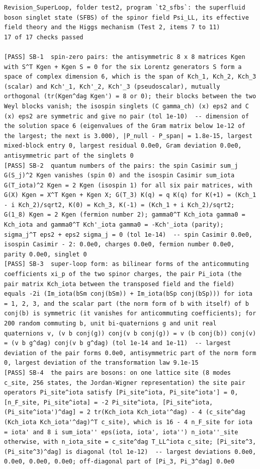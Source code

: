 \documentclass[
  10pt,
]{article}
\begin{document}
\begin{verbatim}
Revision_SuperLoop, folder test2, program `t2_sfbs`: the superfluid boson singlet state (SFBS) of the spinor field Psi_LL, its effective field theory and the Higgs mechanism (Test 2, items 7 to 11)
17 of 17 checks passed

[PASS] SB-1  spin-zero pairs: the antisymmetric 8 x 8 matrices Kgen with S^T Kgen + Kgen S = 0 for the six Lorentz generators S form a space of complex dimension 6, which is the span of Kch_1, Kch_2, Kch_3 (scalar) and Kch'_1, Kch'_2, Kch'_3 (pseudoscalar), mutually orthogonal (tr(Kgen^dag Kgen') = 8 or 0); their blocks between the two Weyl blocks vanish; the isospin singlets (C gamma_ch) (x) eps2 and C (x) eps2 are symmetric and give no pair (tol 1e-10)  -- dimension of the solution space 6 (eigenvalues of the Gram matrix below 1e-12 of the largest; the next is 3.000), |P_null - P_span| = 1.8e-15, largest mixed-block entry 0, largest residual 0.0e0, Gram deviation 0.0e0, antisymmetric part of the singlets 0
[PASS] SB-2  quantum numbers of the pairs: the spin Casimir sum_j G(S_j)^2 Kgen vanishes (spin 0) and the isospin Casimir sum_iota G(T_iota)^2 Kgen = 2 Kgen (isospin 1) for all six pair matrices, with G(X) Kgen = X^T Kgen + Kgen X; G(T_3) K(q) = q K(q) for K(+1) = (Kch_1 - i Kch_2)/sqrt2, K(0) = Kch_3, K(-1) = (Kch_1 + i Kch_2)/sqrt2; G(1_8) Kgen = 2 Kgen (fermion number 2); gamma0^T Kch_iota gamma0 = Kch_iota and gamma0^T Kch'_iota gamma0 = -Kch'_iota (parity); sigma_j^T eps2 + eps2 sigma_j = 0 (tol 1e-14)  -- spin Casimir 0.0e0, isospin Casimir - 2: 0.0e0, charges 0.0e0, fermion number 0.0e0, parity 0.0e0, singlet 0
[PASS] SB-3  super-loop form: as bilinear forms of the anticommuting coefficients xi_p of the two spinor charges, the pair Pi_iota (the pair matrix Kch_iota between the transposed field and the field) equals -2i (Im_iota(bSm conj(bSm)) + Im_iota(bSp conj(bSp))) for iota = 1, 2, 3, and the scalar part (the norm form of b with itself) of b conj(b) is symmetric (it vanishes for anticommuting coefficients); for 200 random commuting b, unit bi-quaternions g and unit real quaternions v, (v b conj(g)) conj(v b conj(g)) = v (b conj(b)) conj(v) = (v b g^dag) conj(v b g^dag) (tol 1e-14 and 1e-11)  -- largest deviation of the pair forms 0.0e0, antisymmetric part of the norm form 0, largest deviation of the transformation law 9.1e-15
[PASS] SB-4  the pairs are bosons: on one lattice site (8 modes c_site, 256 states, the Jordan-Wigner representation) the site pair operators Pi_site^iota satisfy [Pi_site^iota, Pi_site^iota'] = 0, [n_F_site, Pi_site^iota] = -2 Pi_site^iota, [Pi_site^iota, (Pi_site^iota')^dag] = 2 tr(Kch_iota Kch_iota'^dag) - 4 (c_site^dag (Kch_iota Kch_iota'^dag)^T c_site), which is 16 - 4 n_F_site for iota = iota' and 8 i sum_iota'' eps(iota, iota', iota'') n_iota''_site otherwise, with n_iota_site = c_site^dag T_LL^iota c_site; [Pi_site^3, (Pi_site^3)^dag] is diagonal (tol 1e-12)  -- largest deviations 0.0e0, 0.0e0, 0.0e0, 0.0e0; off-diagonal part of [Pi_3, Pi_3^dag] 0.0e0

\end{verbatim}
\end{document}
